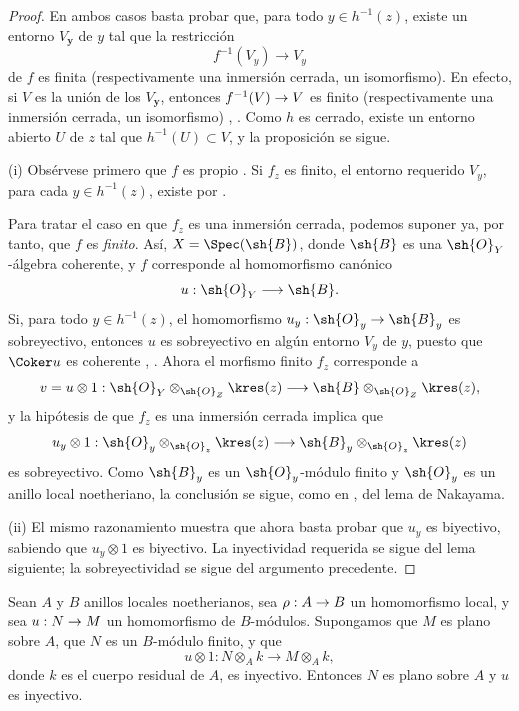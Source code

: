 \documentclass[oneside]{amsart}
\makeatletter
\newcommand{\ega@arrow}[2]{\mathchoice{#1}{#2}{#2}{#2}}
\renewcommand{\to}{\ega@arrow{\longrightarrow}{\rightarrow}}
\newcommand{\oldpage}[2][]{{\marginnote{\normalfont\textbf{#1}~|~#2}}\ignorespaces}
\let\EGAOriginalLabel\label
\renewcommand{\label}[1]{\phantomsection\EGAOriginalLabel{#1}}
\makeatother
\begin{document}
\begin{proof}
En ambos casos basta probar que, para todo
$y\in h^{-1}(z)$, existe un entorno $V_{\boldsymbol{y}}$ de $y$ tal que
la restricción
\[
  f^{-1}(V_y)\longrightarrow V_y
\]
de $f$ es finita (respectivamente una inmersión cerrada, un isomorfismo).
En efecto, si $V$ es la unión de los $V_{\boldsymbol{y}}$, entonces
$f^{-1}(V)\to V$ es finito (respectivamente una inmersión cerrada, un
isomorfismo) , . Como $h$ es
cerrado, existe un entorno abierto $U$ de $z$ tal que
$h^{-1}(U)\subset V$, y la proposición se sigue.

\noindent (i) Obsérvese primero que $f$ es propio
. Si
$f_z$ es finito, el entorno requerido $V_y$, para cada
$y\in h^{-1}(z)$, existe por .

\oldpage[III]{143}

Para tratar el caso en que $f_z$ es una inmersión cerrada, podemos
suponer ya, por tanto, que $f$ es \emph{finito}. Así,
$X=\Spec(\sh{B})$, donde $\sh{B}$ es una
$\sh{O}_Y$-álgebra coherente, y $f$ corresponde  al
homomorfismo canónico
\[
  u:\sh{O}_Y\longrightarrow\sh{B}.
\]
Si, para todo $y\in h^{-1}(z)$, el homomorfismo
$u_y:\sh{O}_y\to\sh{B}_y$ es sobreyectivo, entonces $u$ es sobreyectivo en
algún entorno $V_y$ de $y$, puesto que $\Coker u$ es coherente
, . Ahora el morfismo finito
$f_z$ corresponde a
\[
  v=u\otimes1:
  \sh{O}_Y\otimes_{\sh{O}_Z}\kres(z)
  \longrightarrow
  \sh{B}\otimes_{\sh{O}_Z}\kres(z),
\]
y la hipótesis de que $f_z$ es una inmersión cerrada implica que
\[
  u_y\otimes1:
  \sh{O}_y\otimes_{\sh{O}_z}\kres(z)
  \longrightarrow
  \sh{B}_y\otimes_{\sh{O}_z}\kres(z)
\]
es sobreyectivo. Como $\sh{B}_y$ es un $\sh{O}_y$-módulo finito y
$\sh{O}_y$ es un anillo local noetheriano, la conclusión se sigue, como
en , del lema de Nakayama.

\noindent (ii) El mismo razonamiento muestra que ahora
basta probar
que $u_y$ es biyectivo, sabiendo que $u_y\otimes1$ es biyectivo.
La inyectividad requerida se sigue del lema siguiente; la sobreyectividad
se sigue del argumento precedente.
\end{proof}

\begin{lemma}[4.6.7.1]
\label{III.4.6.7.1}
Sean $A$ y $B$ anillos locales noetherianos, sea
$\rho:A\to B$ un homomorfismo local, y sea $u:N\to M$ un
homomorfismo de $B$-módulos. Supongamos que $M$ es plano sobre $A$,
que $N$ es un $B$-módulo finito, y que
\[
  u\otimes1:
  N\otimes_A k\longrightarrow M\otimes_A k,
\]
donde $k$ es el cuerpo residual de $A$, es inyectivo. Entonces $N$ es
plano sobre $A$ y $u$ es inyectivo.
\end{lemma}
\end{document}
